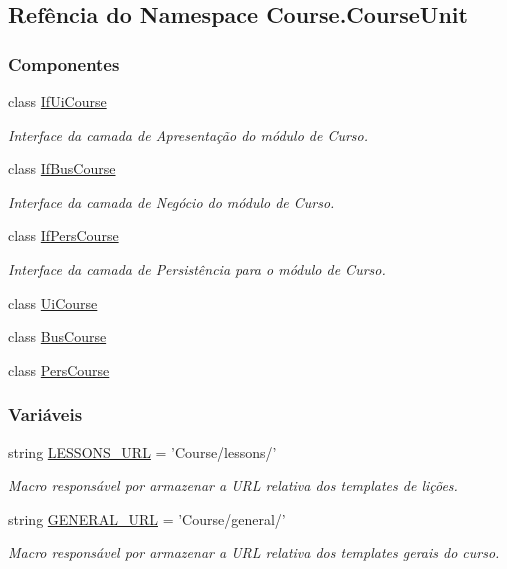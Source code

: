 \hypertarget{namespaceCourse_1_1CourseUnit}{\subsection{Refência do Namespace Course.\-Course\-Unit}
\label{namespaceCourse_1_1CourseUnit}
}
\subsubsection*{Componentes}
\begin{DoxyCompactItemize}
\item 
class \hyperlink{classCourse_1_1CourseUnit_1_1IfUiCourse}{If\-Ui\-Course}
\begin{DoxyCompactList}\small\item\em Interface da camada de Apresentação do módulo de Curso. \end{DoxyCompactList}\item 
class \hyperlink{classCourse_1_1CourseUnit_1_1IfBusCourse}{If\-Bus\-Course}
\begin{DoxyCompactList}\small\item\em Interface da camada de Negócio do módulo de Curso. \end{DoxyCompactList}\item 
class \hyperlink{classCourse_1_1CourseUnit_1_1IfPersCourse}{If\-Pers\-Course}
\begin{DoxyCompactList}\small\item\em Interface da camada de Persistência para o módulo de Curso. \end{DoxyCompactList}\item 
class \hyperlink{classCourse_1_1CourseUnit_1_1UiCourse}{Ui\-Course}
\item 
class \hyperlink{classCourse_1_1CourseUnit_1_1BusCourse}{Bus\-Course}
\item 
class \hyperlink{classCourse_1_1CourseUnit_1_1PersCourse}{Pers\-Course}
\end{DoxyCompactItemize}
\subsubsection*{Variáveis}
\begin{DoxyCompactItemize}
\item 
string \hyperlink{namespaceCourse_1_1CourseUnit_a5ba3476c382ac640c10e98345fb14a85}{L\-E\-S\-S\-O\-N\-S\-\_\-\-U\-R\-L} = 'Course/lessons/'
\begin{DoxyCompactList}\small\item\em Macro responsável por armazenar a U\-R\-L relativa dos templates de lições. \end{DoxyCompactList}\item 
string \hyperlink{namespaceCourse_1_1CourseUnit_a3cd710129a2643083c77f1999a514340}{G\-E\-N\-E\-R\-A\-L\-\_\-\-U\-R\-L} = 'Course/general/'
\begin{DoxyCompactList}\small\item\em Macro responsável por armazenar a U\-R\-L relativa dos templates gerais do curso. \end{DoxyCompactList}\end{DoxyCompactItemize}


